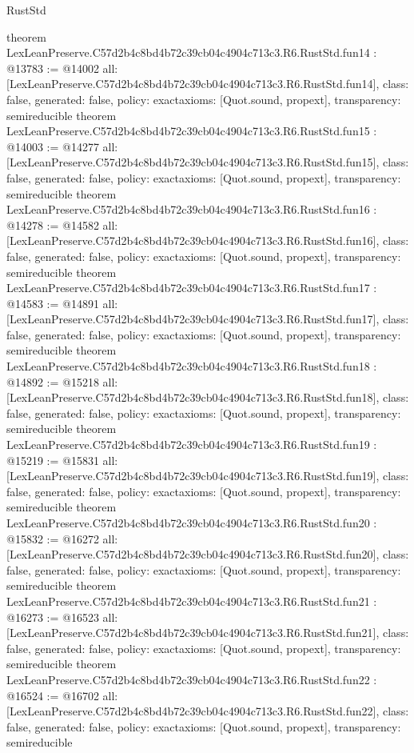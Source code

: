 \begin{lexlean}{RustStd}
\begin{coremodule}
{}
theorem LexLeanPreserve.C57d2b4c8bd4b72c39cb04c4904c713c3.R6.RustStd.fun14 : @13783 := @14002 {
  all: [LexLeanPreserve.C57d2b4c8bd4b72c39cb04c4904c713c3.R6.RustStd.fun14],
  class: false,
  generated: false,
  policy: exact{axioms: [Quot.sound, propext]},
  transparency: semireducible
}
theorem LexLeanPreserve.C57d2b4c8bd4b72c39cb04c4904c713c3.R6.RustStd.fun15 : @14003 := @14277 {
  all: [LexLeanPreserve.C57d2b4c8bd4b72c39cb04c4904c713c3.R6.RustStd.fun15],
  class: false,
  generated: false,
  policy: exact{axioms: [Quot.sound, propext]},
  transparency: semireducible
}
theorem LexLeanPreserve.C57d2b4c8bd4b72c39cb04c4904c713c3.R6.RustStd.fun16 : @14278 := @14582 {
  all: [LexLeanPreserve.C57d2b4c8bd4b72c39cb04c4904c713c3.R6.RustStd.fun16],
  class: false,
  generated: false,
  policy: exact{axioms: [Quot.sound, propext]},
  transparency: semireducible
}
theorem LexLeanPreserve.C57d2b4c8bd4b72c39cb04c4904c713c3.R6.RustStd.fun17 : @14583 := @14891 {
  all: [LexLeanPreserve.C57d2b4c8bd4b72c39cb04c4904c713c3.R6.RustStd.fun17],
  class: false,
  generated: false,
  policy: exact{axioms: [Quot.sound, propext]},
  transparency: semireducible
}
theorem LexLeanPreserve.C57d2b4c8bd4b72c39cb04c4904c713c3.R6.RustStd.fun18 : @14892 := @15218 {
  all: [LexLeanPreserve.C57d2b4c8bd4b72c39cb04c4904c713c3.R6.RustStd.fun18],
  class: false,
  generated: false,
  policy: exact{axioms: [Quot.sound, propext]},
  transparency: semireducible
}
theorem LexLeanPreserve.C57d2b4c8bd4b72c39cb04c4904c713c3.R6.RustStd.fun19 : @15219 := @15831 {
  all: [LexLeanPreserve.C57d2b4c8bd4b72c39cb04c4904c713c3.R6.RustStd.fun19],
  class: false,
  generated: false,
  policy: exact{axioms: [Quot.sound, propext]},
  transparency: semireducible
}
theorem LexLeanPreserve.C57d2b4c8bd4b72c39cb04c4904c713c3.R6.RustStd.fun20 : @15832 := @16272 {
  all: [LexLeanPreserve.C57d2b4c8bd4b72c39cb04c4904c713c3.R6.RustStd.fun20],
  class: false,
  generated: false,
  policy: exact{axioms: [Quot.sound, propext]},
  transparency: semireducible
}
theorem LexLeanPreserve.C57d2b4c8bd4b72c39cb04c4904c713c3.R6.RustStd.fun21 : @16273 := @16523 {
  all: [LexLeanPreserve.C57d2b4c8bd4b72c39cb04c4904c713c3.R6.RustStd.fun21],
  class: false,
  generated: false,
  policy: exact{axioms: [Quot.sound, propext]},
  transparency: semireducible
}
theorem LexLeanPreserve.C57d2b4c8bd4b72c39cb04c4904c713c3.R6.RustStd.fun22 : @16524 := @16702 {
  all: [LexLeanPreserve.C57d2b4c8bd4b72c39cb04c4904c713c3.R6.RustStd.fun22],
  class: false,
  generated: false,
  policy: exact{axioms: [Quot.sound, propext]},
  transparency: semireducible
}
\end{coremodule}
\end{lexlean}
